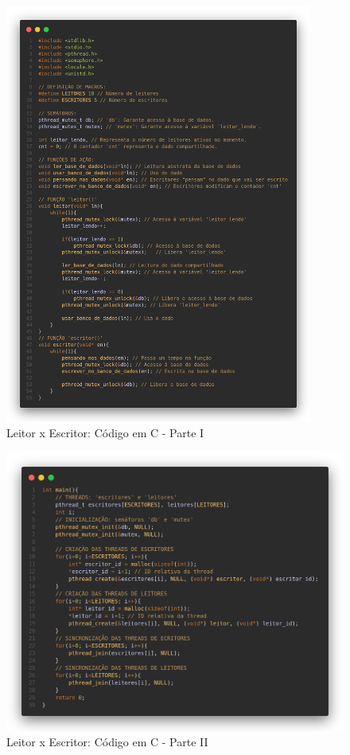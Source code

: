 \documentclass[
	12pt,				%
	openright,			%
	oneside,			%
	a4paper,			%
	chapter=TITLE,		%
	english,			%
	french,				%
	spanish,			%
	brazil				%
	]{abntex2}
\theoremstyle{definition}
\begin{document}
\begin{figure}[h]
    \centering
    \includegraphics[width=0.9\textwidth]{imagens/leitor_escritor_1.png}
    \caption{Leitor x Escritor: Código em C - Parte I}
    \label{fig:2}
\end{figure}

\begin{figure}[h]
    \centering
    \includegraphics[width=1.0\textwidth]{imagens/leitor_escritor_2.png}
    \caption{Leitor x Escritor: Código em C - Parte II}
    \label{fig:3}
\end{figure}
\end{document}
